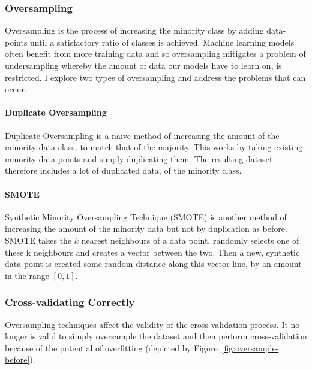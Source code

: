 \documentclass[12pt,a4paper,twoside]{report}
\begin{document}
\subsubsection{Oversampling}
Oversampling is the process of increasing the minority class by adding data-points until a satisfactory ratio of classes is achieved. Machine learning models often benefit from more training data and so oversampling mitigates a problem of undersampling whereby the amount of data our models have to learn on, is restricted. 
I explore two types of oversampling and address the problems that can occur.

\paragraph{Duplicate Oversampling} 
Duplicate Oversampling is a naive method of increasing the amount of the minority data class, to match that of the majority. This works by taking existing minority data points and simply duplicating them. The resulting dataset therefore includes a lot of duplicated data, of the minority class.

\paragraph{SMOTE} 
Synthetic Minority Oversampling Technique (SMOTE) is another method of increasing the amount of the minority data but not by duplication as before. SMOTE takes the $k$ nearest neighbours of a data point, randomly selects one of these k neighbours and creates a vector between the two. Then a new, synthetic data point is created some random distance along this vector line, by an amount in the range $[0,1]$.

\subsubsection{Cross-validating Correctly}
Oversampling techniques affect the validity of the cross-validation process. It no longer is valid to simply oversample the dataset and then perform cross-validation because of the potential of overfitting (depicted by Figure~\ref{fig:oversample-before}).
\end{document}
